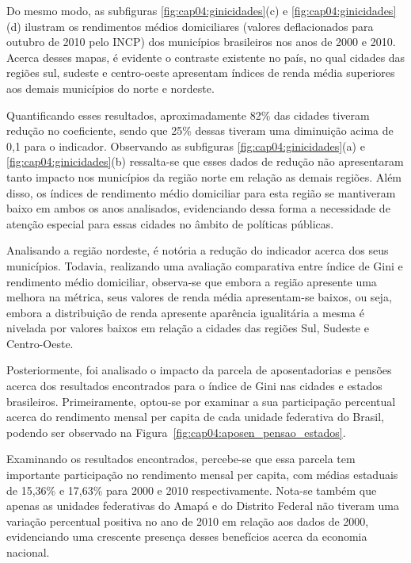 Do mesmo modo, as subfiguras \ref{fig:cap04:ginicidades}(c) e \ref{fig:cap04:ginicidades}(d) ilustram os rendimentos médios domiciliares (valores deflacionados para outubro de 2010 pelo INCP) dos municípios brasileiros nos anos de 2000 e 2010. Acerca desses mapas, é evidente o contraste existente no país, no qual cidades das regiões sul, sudeste e centro-oeste apresentam índices de renda média superiores aos demais municípios do norte e nordeste. 

Quantificando esses resultados, aproximadamente 82\% das cidades tiveram redução no coeficiente, sendo que 25\% dessas tiveram uma diminuição acima de 0,1 para o indicador. Observando as subfiguras \ref{fig:cap04:ginicidades}(a) e \ref{fig:cap04:ginicidades}(b) ressalta-se que esses dados de redução não apresentaram tanto impacto nos municípios da região norte em relação as demais regiões. Além disso, os índices de rendimento médio domiciliar para esta região se mantiveram baixo em ambos os anos analisados, evidenciando dessa forma a necessidade de atenção especial para essas cidades no âmbito de políticas públicas.

Analisando a região nordeste, é notória a redução do indicador acerca dos seus municípios. Todavia, realizando uma avaliação comparativa entre índice de Gini e rendimento médio domiciliar, observa-se que embora a região apresente uma melhora na métrica, seus valores de renda média apresentam-se baixos, ou seja, embora a distribuição de renda apresente aparência igualitária a mesma é nivelada por valores baixos em relação a cidades das regiões Sul, Sudeste e Centro-Oeste. 

\pagebreak

Posteriormente, foi analisado o impacto da parcela de aposentadorias e pensões acerca dos resultados encontrados para o índice de Gini nas cidades e estados brasileiros. Primeiramente, optou-se por examinar a sua participação percentual acerca do rendimento mensal per capita de cada unidade federativa do Brasil, podendo ser observado na Figura~\ref{fig:cap04:aposen_pensao_estados}.

Examinando os resultados encontrados, percebe-se que essa parcela tem importante participação no rendimento mensal per capita, com médias estaduais de 15,36\% e 17,63\% para 2000 e 2010 respectivamente. Nota-se também que apenas as unidades federativas do Amapá e do Distrito Federal não tiveram uma variação percentual positiva no ano de 2010 em relação aos dados de 2000, evidenciando uma crescente presença desses benefícios acerca da economia nacional.

